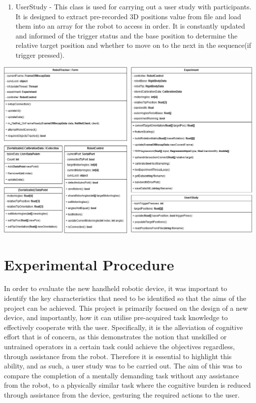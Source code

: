 \documentclass[11pt]{article}
\begin{document}
\begin{enumerate}
\item{UserStudy - This class is used for carrying out a user study with participants. It is designed to extract pre-recorded 3D positions value from file and load them into an array for the robot to access in order. It is constantly updated and informed of the trigger status and the base position to determine the relative target position and whether to move on to the next in the sequence(if trigger pressed).}
\end{enumerate}


\begin{landscape}

\begin{center}
\includegraphics[width=1.4\textwidth]{images/classDiagram2.png}
\label{figure:classDiagram}
\end{center}


\end{landscape}



\section{Experimental Procedure}

In order to evaluate the new handheld robotic device, it was important to identify the key characteristics that need to be identified so that the aims of the project can be achieved. This project is primarily focused on the design of a new device, and importantly, how it can utilise pre-acquired task knowledge to effectively cooperate with the user. Specifically, it is the alleviation of cognitive effort that is of concern, as this demonstrates the notion that unskilled or untrained operators in a certain task could achieve the objectives regardless, through assistance from the robot. Therefore it is essential to highlight this ability, and as such, a user study was to be carried out. The aim of this was to compare the completion of a mentally demanding task without any assistance from the robot, to a physically similar task where the cognitive burden is reduced through assistance from the device, gesturing the required actions to the user.
\end{document}
